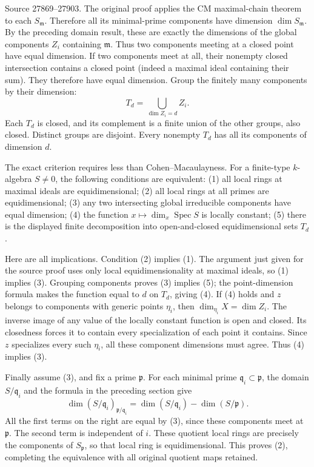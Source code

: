 Source 27869--27903. The original proof applies the CM maximal-chain theorem to each \(S_{\mathfrak m}\). Therefore all its minimal-prime components have dimension \(\dim S_{\mathfrak m}\). By the preceding domain result, these are exactly the dimensions of the global components \(Z_i\) containing \(\mathfrak m\). Thus two components meeting at a closed point have equal dimension. If two components meet at all, their nonempty closed intersection contains a closed point (indeed a maximal ideal containing their sum). They therefore have equal dimension. Group the finitely many components by their dimension: \[
 T_d=\bigcup_{\dim Z_i=d}Z_i.
\] Each \(T_d\) is closed, and its complement is a finite union of the other groups, also closed. Distinct groups are disjoint. Every nonempty \(T_d\) has all its components of dimension \(d\).

The exact criterion requires less than Cohen--Macaulayness. For a finite-type \(k\)-algebra \(S\ne0\), the following conditions are equivalent: (1) all local rings at maximal ideals are equidimensional; (2) all local rings at all primes are equidimensional; (3) any two intersecting global irreducible components have equal dimension; (4) the function \(x\mapsto\dim_x\operatorname{Spec}S\) is locally constant; (5) there is the displayed finite decomposition into open-and-closed equidimensional sets \(T_d\).

Here are all implications. Condition (2) implies (1). The argument just given for the source proof uses only local equidimensionality at maximal ideals, so (1) implies (3). Grouping components proves (3) implies (5); the point-dimension formula makes the function equal to \(d\) on \(T_d\), giving (4). If (4) holds and \(z\) belongs to components with generic points \(\eta_i\), then \(\dim_{\eta_i}X=\dim Z_i\). The inverse image of any value of the locally constant function is open and closed. Its closedness forces it to contain every specialization of each point it contains. Since \(z\) specializes every such \(\eta_i\), all these component dimensions must agree. Thus (4) implies (3).

Finally assume (3), and fix a prime \(\mathfrak p\). For each minimal prime \(\mathfrak q_i\subset\mathfrak p\), the domain \(S/\mathfrak q_i\) and the formula in the preceding section give \[
 \dim (S/\mathfrak q_i)_{\mathfrak p/\mathfrak q_i}
   =\dim(S/\mathfrak q_i)-\dim(S/\mathfrak p).
\] All the first terms on the right are equal by (3), since these components meet at \(\mathfrak p\). The second term is independent of \(i\). These quotient local rings are precisely the components of \(S_{\mathfrak p}\), so that local ring is equidimensional. This proves (2), completing the equivalence with all original quotient maps retained.

